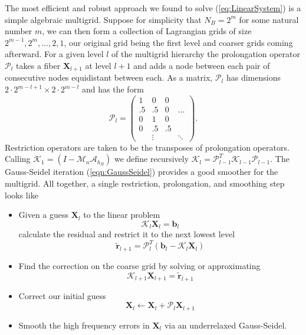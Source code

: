\documentclass[preprint,12pt]{elsarticle}
\begin{document}
The most efficient and robust approach we found to solve  (\ref{eq:LinearSystem}) is a simple algebraic multigrid. Suppose for simplicity that $N_B=2^m$ for some natural number $m$, we can then form a collection of Lagrangian grids of size $2^{m-1},2^m,\dots,2,1$, our original grid being the first level and coarser grids coming afterward.
For a given level $l$ of the multigrid hierarchy the prolongation operator $\mathcal{P}_l$ takes a fiber $\mathbf{X}_{l+1}$ at level $l+1$ and adds a node between each pair of consecutive nodes equidistant between each. As a matrix,  $\mathcal{P}_l$ has dimensions $2\cdot 2^{m-l+1}\times 2\cdot 2^{m-l}$ and has the form
\begin{equation}
\mathcal{P}_l = 
\left( \begin{array}{cccc}
1  & 0  & 0  &  \\
.5 & .5 & 0  & \dots \\
0  & 1  & 0  & \\
0  & .5 & .5 & \\
   &\vdots& & \ddots
\end{array} \right).
\end{equation}
Restriction operators are taken to be the transposes of prolongation operators. Calling $\mathcal{K}_1 = (\mathit{I}- \mathcal{M}_n\mathcal{A}_{h_B})$ we define recursively $\mathcal{K}_l = \mathcal{P}_{l-1}^{\mathit{T}} \mathcal{K}_{l-1} \mathcal{P}_{l-1}$. The Gauss-Seidel iteration (\ref{eqn:GaussSeidel}) provides a good smoother for the multigrid.
All together,  a single restriction, prolongation, and smoothing step looks like
\begin{itemize}
\item Given a guess $\mathbf{X}_l$ to the linear problem
\begin{equation}
\mathcal{K}_l\mathbf{X}_l = \mathbf{b}_l
\end{equation}
calculate the residual and restrict it to the next lowest level
\begin{equation}
\tilde{\mathbf{r}}_{l+1} = \mathcal{P}_l^T(\mathbf{b}_l - \mathcal{K}_l\mathbf{X}_l)
\end{equation}
\item Find the correction on the coarse grid by solving or approximating
\begin{equation}
\mathcal{K}_{l+1}\mathbf{X}_{l+1} = \tilde{\mathbf{r}}_{l+1}
\end{equation}
\item Correct our initial guess
\begin{equation}
\mathbf{X}_l \leftarrow \mathbf{X}_l + \mathcal{P}_l \mathbf{X}_{l+1}
\end{equation}
\item Smooth the high frequency errors in $\mathbf{X}_l$ via an underrelaxed Gauss-Seidel.
\end{itemize}
\end{document}
